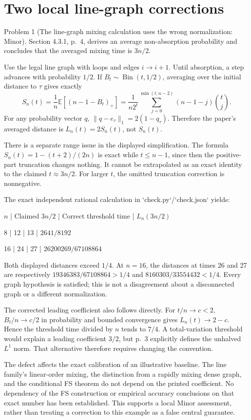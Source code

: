 \documentclass[10pt]{article}
\begin{document}
\section*{Two local line-graph corrections}
Problem 1 (The line-graph mixing calculation uses the wrong normalization: Minor).  Section 4.3.1, p. 4, derives an average non-absorption probability and concludes that the averaged mixing time is \(3n/2\).\par
Use the legal line graph with loops and edges \(i\to i+1\). Until absorption, a step advances with probability \(1/2\). If \(B_t\sim\operatorname{Bin}(t,1/2)\), averaging over the initial distance to \(\tau\) gives exactly \[S_n(t)=\frac1n\mathbb E[(n-1-B_t)_+]
=\frac{1}{n2^t}\sum_{j=0}^{\min(t,n-2)}(n-1-j)\binom tj .\] For any probability vector \(q\), \(\|q-e_\tau\|_1=2(1-q_\tau)\). Therefore the paper’s averaged distance is \(L_n(t)=2S_n(t)\), not \(S_n(t)\).\par
There is a separate range issue in the displayed simplification. The formula \(S_n(t)=1-(t+2)/(2n)\) is exact while \(t\le n-1\), since then the positive-part truncation changes nothing. It cannot be extrapolated as an exact identity to the claimed \(t\approx3n/2\). For larger \(t\), the omitted truncation correction is nonnegative.\par
The exact independent rational calculation in `check.py`/`check.json` yields:\par
\(n\) | Claimed \(3n/2\) | Correct threshold time | \(L_n(3n/2)\)\par
8 | 12 | 13 | \(2641/8192\)\par
16 | 24 | 27 | \(26200269/67108864\)\par
Both displayed distances exceed \(1/4\). At \(n=16\), the distances at times 26 and 27 are respectively \(19346383/67108864>1/4\) and \(8160303/33554432<1/4\). Every graph hypothesis is satisfied; this is not a disagreement about a disconnected graph or a different normalization.\par
The corrected leading coefficient also follows directly. For \(t/n\to c<2\), \(B_t/n\to c/2\) in probability and bounded convergence gives \(L_n(t)\to2-c\). Hence the threshold time divided by \(n\) tends to \(7/4\). A total-variation threshold would explain a leading coefficient \(3/2\), but p. 3 explicitly defines the unhalved \(L^1\) norm. That alternative therefore requires changing the convention.\par
The defect affects the exact calibration of an illustrative baseline. The line family’s linear-order mixing, the distinction from a rapidly mixing dense graph, and the conditional FS theorem do not depend on the printed coefficient. No dependency of the FS construction or empirical accuracy conclusions on that exact number has been established. This supports a local Minor assessment, rather than treating a correction to this example as a false central guarantee.\par
\end{document}
